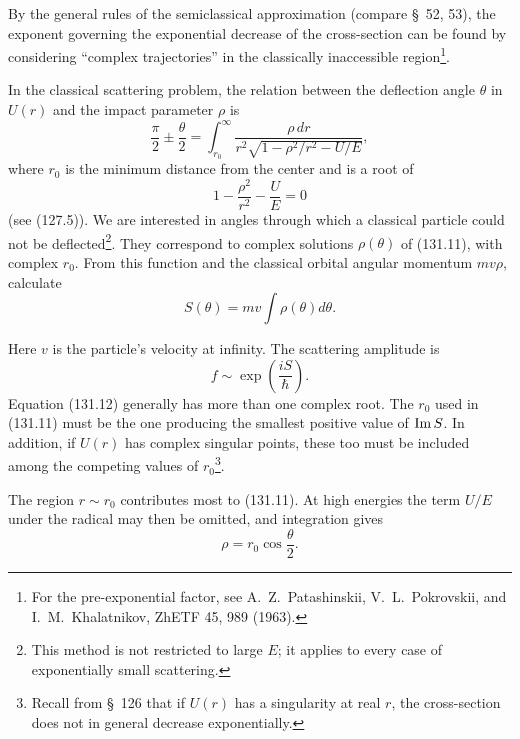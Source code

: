 By the general rules of the semiclassical approximation (compare \S~52, 53),
the exponent governing the exponential decrease of the cross-section can be
found by considering ``complex trajectories'' in the classically inaccessible
region\footnote{For the pre-exponential factor, see A.~Z.~Patashinskii,
V.~L.~Pokrovskii, and I.~M.~Khalatnikov, ZhETF 45, 989 (1963).}.

In the classical scattering problem, the relation between the deflection angle
$\theta$ in $U(r)$ and the impact parameter $\rho$ is
\begin{equation}
 \frac\pi2\pm\frac\theta2=
 \int_{r_0}^{\infty}\frac{\rho\,dr}
 {r^2\sqrt{1-\rho^2/r^2-U/E}},
 \tag{131.11}
\end{equation}
where $r_0$ is the minimum distance from the center and is a root of
\begin{equation}
 1-\frac{\rho^2}{r^2}-\frac UE=0
 \tag{131.12}
\end{equation}
(see (127.5)). We are interested in angles through which a classical particle
could not be deflected\footnote{This method is not restricted to large $E$;
it applies to every case of exponentially small scattering.}. They correspond
to complex solutions $\rho(\theta)$ of (131.11), with complex $r_0$. From this
function and the classical orbital angular momentum $mv\rho$, calculate
\begin{equation}
 S(\theta)=mv\int\rho(\theta)d\theta.
 \tag{131.13}
\end{equation}

Here $v$ is the particle's velocity at infinity. The scattering amplitude is
\begin{equation}
 f\sim\exp\left(\frac{iS}{\hbar}\right).
 \tag{131.14}
\end{equation}
Equation (131.12) generally has more than one complex root. The $r_0$ used in
(131.11) must be the one producing the smallest positive value of
$\mathop{\rm Im}S$. In addition, if $U(r)$ has complex singular points, these
too must be included among the competing values of $r_0$\footnote{Recall from
\S~126 that if $U(r)$ has a singularity at real $r$, the cross-section does
not in general decrease exponentially.}.

The region $r\sim r_0$ contributes most to (131.11). At high energies the term
$U/E$ under the radical may then be omitted, and integration gives
\begin{equation}
 \rho=r_0\cos\frac\theta2.
 \tag{131.15}
\end{equation}

